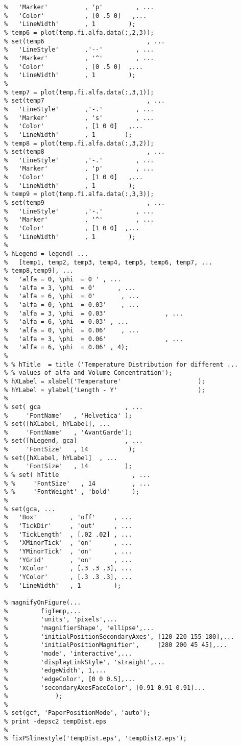 \begin{lstlisting}
%   'Marker'          , 'p'         , ...
%   'Color'           , [0 .5 0]   ,...
%   'LineWidth'       , 1         );
% temp6 = plot(temp.fi.alfa.data(:,2,3));
% set(temp6                            , ...
%   'LineStyle'       ,'--'         , ...
%   'Marker'          , '^'         , ...
%   'Color'           , [0 .5 0]  ,...
%   'LineWidth'       , 1         );
% 
% temp7 = plot(temp.fi.alfa.data(:,3,1));
% set(temp7                            , ...
%   'LineStyle'       ,'-.'         , ...
%   'Marker'          , 's'         , ...
%   'Color'           , [1 0 0]   ,...
%   'LineWidth'       , 1        );
% temp8 = plot(temp.fi.alfa.data(:,3,2));
% set(temp8                            , ...
%   'LineStyle'       ,'-.'         , ...
%   'Marker'          , 'p'         , ...
%   'Color'           , [1 0 0]   ,...
%   'LineWidth'       , 1         );
% temp9 = plot(temp.fi.alfa.data(:,3,3));
% set(temp9                            , ...
%   'LineStyle'       ,'-.'         , ...
%   'Marker'          , '^'         , ...
%   'Color'           , [1 0 0]  ,...
%   'LineWidth'       , 1         );
% 
% hLegend = legend( ...
%   [temp1, temp2, temp3, temp4, temp5, temp6, temp7, ... 
% temp8,temp9], ...
%   'alfa = 0, \phi  = 0 ' , ...
%   'alfa = 3, \phi  = 0'      , ...
%   'alfa = 6, \phi  = 0'       , ...
%   'alfa = 0, \phi  = 0.03'    , ...
%   'alfa = 3, \phi  = 0.03'                , ...
%   'alfa = 6, \phi  = 0.03' , ...
%   'alfa = 0, \phi  = 0.06'    , ...
%   'alfa = 3, \phi  = 0.06'                , ...
%   'alfa = 6, \phi  = 0.06' , 4);
% 
% % hTitle  = title ('Temperature Distribution for different ...
% % values of alfa and Volume Concentration');
% hXLabel = xlabel('Temperature'                     );
% hYLabel = ylabel('Length - Y'                      );
% 
% set( gca                       , ...
%     'FontName'   , 'Helvetica' );
% set([hXLabel, hYLabel], ...
%     'FontName'   , 'AvantGarde');
% set([hLegend, gca]             , ...
%     'FontSize'   , 14           );
% set([hXLabel, hYLabel]  , ...
%     'FontSize'   , 14          );
% % set( hTitle                    , ...
% %     'FontSize'   , 14          , ...
% %     'FontWeight' , 'bold'      );
% 
% set(gca, ...
%   'Box'         , 'off'     , ...
%   'TickDir'     , 'out'     , ...
%   'TickLength'  , [.02 .02] , ...
%   'XMinorTick'  , 'on'      , ...
%   'YMinorTick'  , 'on'      , ...
%   'YGrid'       , 'on'      , ...
%   'XColor'      , [.3 .3 .3], ...
%   'YColor'      , [.3 .3 .3], ...
%   'LineWidth'   , 1         );

% magnifyOnFigure(...
%         figTemp,...
%         'units', 'pixels',...
%         'magnifierShape', 'ellipse',...
%         'initialPositionSecondaryAxes', [120 220 155 180],...
%         'initialPositionMagnifier',     [280 200 45 45],...    
%         'mode', 'interactive',...    
%         'displayLinkStyle', 'straight',...        
%         'edgeWidth', 1,...
%         'edgeColor', [0 0 0.5],...
%         'secondaryAxesFaceColor', [0.91 0.91 0.91]... 
%             ); 
%         
% set(gcf, 'PaperPositionMode', 'auto');
% print -depsc2 tempDist.eps
% 
% fixPSlinestyle('tempDist.eps', 'tempDist2.eps');


\end{lstlisting}
